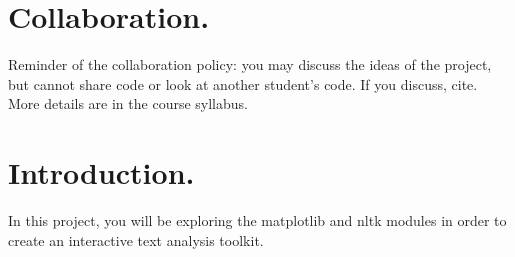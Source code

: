 \documentclass[11pt, letterpaper, onecolumn, oneside, final]{article}
\begin{document}
    \maketitle


    \section{Collaboration.} Reminder of the collaboration policy: you may discuss the ideas of the project, but cannot share code or look at another student’s code. If you discuss, cite. More details are in the course syllabus. 

    \section{Introduction.} In this project, you will be exploring the {\consolas matplotlib} and {\consolas nltk} modules in order to create an interactive text analysis toolkit. 
     
     
     
\end{document}
